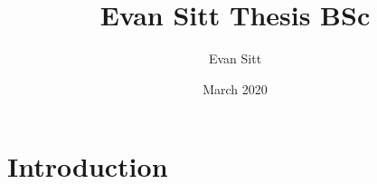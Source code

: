 \documentclass{article}
\title{Evan Sitt Thesis BSc}
\author{Evan Sitt}
\date{March 2020}
\begin{document}
\maketitle

\section{Introduction}
\end{document}
